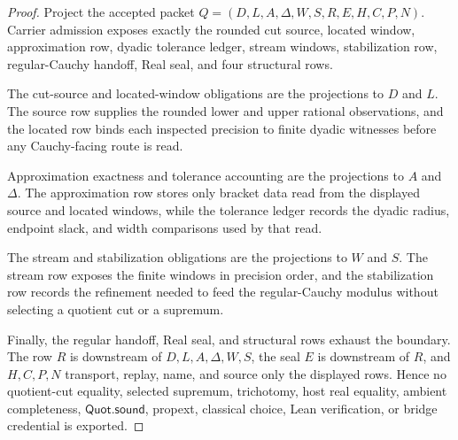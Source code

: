 \begin{proof}
Project the accepted packet $Q=(D,L,A,\Delta,W,S,R,E,H,C,P,N)$. Carrier admission exposes exactly the rounded cut source, located window, approximation row, dyadic tolerance ledger, stream windows, stabilization row, regular-Cauchy handoff, Real seal, and four structural rows.

The cut-source and located-window obligations are the projections to $D$ and $L$. The source row supplies the rounded lower and upper rational observations, and the located row binds each inspected precision to finite dyadic witnesses before any Cauchy-facing route is read.

Approximation exactness and tolerance accounting are the projections to $A$ and $\Delta$. The approximation row stores only bracket data read from the displayed source and located windows, while the tolerance ledger records the dyadic radius, endpoint slack, and width comparisons used by that read.

The stream and stabilization obligations are the projections to $W$ and $S$. The stream row exposes the finite windows in precision order, and the stabilization row records the refinement needed to feed the regular-Cauchy modulus without selecting a quotient cut or a supremum.

Finally, the regular handoff, Real seal, and structural rows exhaust the boundary. The row $R$ is downstream of $D,L,A,\Delta,W,S$, the seal $E$ is downstream of $R$, and $H,C,P,N$ transport, replay, name, and source only the displayed rows. Hence no quotient-cut equality, selected supremum, trichotomy, host real equality, ambient completeness, $\mathsf{Quot.sound}$, propext, classical choice, Lean verification, or bridge credential is exported.
\end{proof}

